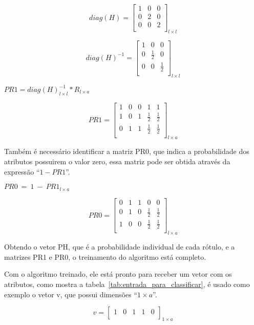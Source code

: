 \begin{anexosenv}
$$diag(H)=\left[
\begin{array}{ccc}
1 & 0 & 0 \\
0 & 2 & 0 \\
0 & 0 & 2 \\
\end{array}
\right]_{l \times l}$$

$$diag(H)^{-1}=\left[
\begin{array}{ccc}
1 & 0 & 0 \\
0 & \frac{1}{2} & 0 \\
0 & 0 & \frac{1}{2} \\
\end{array}
\right]_{l \times l}$$

\begin{center}
$PR1 = diag(H)^{-1}_{l \times l} * R_{l \times a}$
\end{center}

$$PR1=\left[
\begin{array}{ccccc}
1 & 0 & 0 & 1 & 1 \\
1 & 0 & 1 & \frac{1}{2} & \frac{1}{2} \\
0 & 1 & 1 & \frac{1}{2} & \frac{1}{2} \\
\end{array}
\right]_{l \times a}$$

Também é necessário identificar a matriz PR0, que indica a probabilidade dos
atributos possuirem o valor zero, essa matriz pode ser obtida através da
expressão ``$1 - PR1$''.

\begin{center}
$PR0 \ = \ 1 \ - \ PR1_{l \times a}$
\end{center}

$$PR0=\left[
\begin{array}{ccccc}
0 & 1 & 1 & 0 & 0 \\
0 & 1 & 0 & \frac{1}{2} & \frac{1}{2} \\
1 & 0 & 0 & \frac{1}{2} & \frac{1}{2} \\
\end{array}
\right]_{l \times a}$$

Obtendo o vetor PH, que é a probabilidade individual de cada rótulo, e a
matrizes PR1 e PR0, o treinamento do algoritmo está completo.

Com o algoritmo treinado, ele está pronto para receber um vetor com
os atributos, como mostra a tabela~\ref{tab:entrada_para_classificar},
é usado como exemplo o vetor v, que possui dimensões ``${1 \times a}$''.

$$v=\left[
\begin{array}{ccccc}
1 & 0 & 1 & 1 & 0 \\
\end{array}
\right]_{1 \times a}$$


\end{anexosenv}
